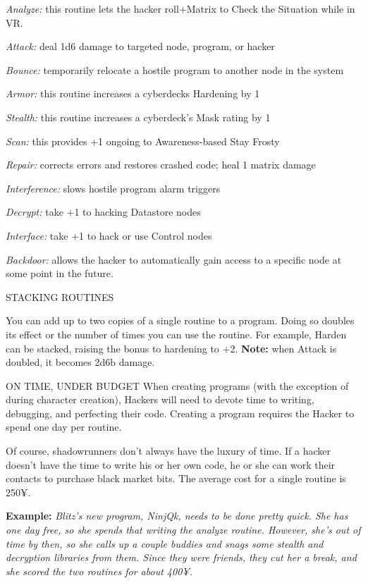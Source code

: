 \documentclass[oneside,10pt]{article}
\begin{document}
\begin{multicols}{2}
\begin{dent}

\textit{Analyze:} this routine lets the hacker roll+Matrix to Check
the Situation while in VR.

\textit{Attack:} deal 1d6 damage to targeted node, program, or
hacker

\textit{Bounce:} temporarily relocate a hostile program to another
node in the system

\textit{Armor:} this routine increases a cyberdecks Hardening by 1

\textit{Stealth:} this routine increases a cyberdeck’s Mask rating
by 1

\textit{Scan:} this provides +1 ongoing to Awareness-based Stay
Frosty

\textit{Repair:} corrects errors and restores crashed code; heal 1
matrix damage

\textit{Interference:} slows hostile program alarm triggers

\textit{Decrypt:} take +1 to hacking Datastore nodes

\textit{Interface:} take +1 to hack or use Control nodes

\textit{Backdoor:} allows the hacker to automatically gain access
to a specific node at some point in the future.
\end{dent}
STACKING ROUTINES

You can add up to two copies of a single routine to a program. Doing so doubles its effect or the number of times you
can use the routine. For example, Harden can be stacked,
raising the bonus to hardening to +2. \textbf{Note:} when Attack is
doubled, it becomes 2d6b damage.

ON TIME, UNDER BUDGET
When creating programs (with the exception of during character creation), Hackers will need to devote time to writing,
debugging, and perfecting their code. Creating a program
requires the Hacker to spend one day per routine.

Of course, shadowrunners don’t always have the luxury of
time. If a hacker doesn’t have the time to write his or her own
code, he or she can work their contacts to purchase black
market bits. The average cost for a single routine is 250¥.
\begin{dent}

\textbf{Example:} \textit{Blitz’s new program, NinjQk, needs to be done
pretty quick. She has one day free, so she spends that
writing the analyze routine. However, she’s out of time
by then, so she calls up a couple buddies and snags some
stealth and decryption libraries from them. Since they were
friends, they cut her a break, and she scored the two routines for about 400¥.}
\end{dent}

\end{multicols}
\end{document}
